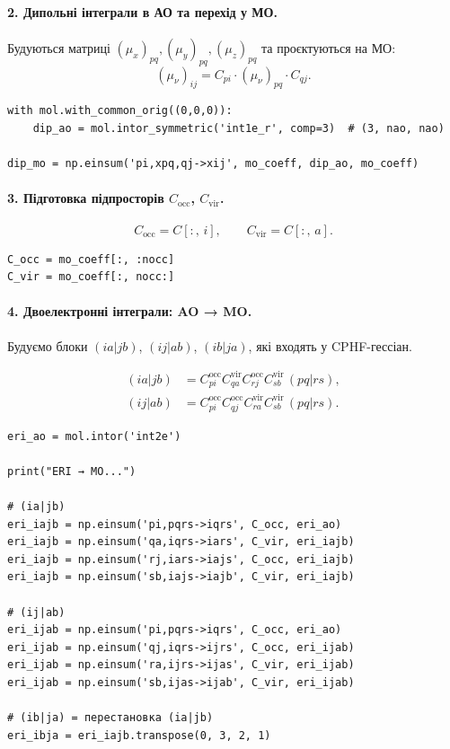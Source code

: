 \paragraph{2. Дипольні інтеграли в АО та перехід у МО.}

Будуються матриці
\( (\mu_x)_{pq}, (\mu_y)_{pq}, (\mu_z)_{pq}\)
та проєктуються на МО:
\[
	(\mu_{\nu})_{ij} = C_{pi}\cdot (\mu_\nu)_{pq}\cdot C_{qj}.
\]

\begin{verbatim}
with mol.with_common_orig((0,0,0)):
    dip_ao = mol.intor_symmetric('int1e_r', comp=3)  # (3, nao, nao)

dip_mo = np.einsum('pi,xpq,qj->xij', mo_coeff, dip_ao, mo_coeff)
\end{verbatim}

\paragraph{3. Підготовка підпросторів $C_{\text{occ}}$, $C_{\text{vir}}$.}

\[
	C_{\text{occ}} = C[:,\, i],\qquad
	C_{\text{vir}} = C[:,\, a].
\]

\begin{verbatim}
C_occ = mo_coeff[:, :nocc]
C_vir = mo_coeff[:, nocc:]
\end{verbatim}

\paragraph{4. Двоелектронні інтеграли: AO → MO.}

Будуємо блоки
\((ia|jb)\), \((ij|ab)\), \((ib|ja)\),
які входять у CPHF-гессіан.

\begin{align*}
	(ia|jb) & = C_{pi}^{\text{occ}} C_{qa}^{\text{vir}}
	C_{rj}^{\text{occ}} C_{sb}^{\text{vir}}\, (pq|rs),
	\\
	(ij|ab) & = C_{pi}^{\text{occ}} C_{qj}^{\text{occ}}
	C_{ra}^{\text{vir}} C_{sb}^{\text{vir}}\, (pq|rs).
\end{align*}

\begin{verbatim}
eri_ao = mol.intor('int2e')

print("ERI → MO...")

# (ia|jb)
eri_iajb = np.einsum('pi,pqrs->iqrs', C_occ, eri_ao)
eri_iajb = np.einsum('qa,iqrs->iars', C_vir, eri_iajb)
eri_iajb = np.einsum('rj,iars->iajs', C_occ, eri_iajb)
eri_iajb = np.einsum('sb,iajs->iajb', C_vir, eri_iajb)

# (ij|ab)
eri_ijab = np.einsum('pi,pqrs->iqrs', C_occ, eri_ao)
eri_ijab = np.einsum('qj,iqrs->ijrs', C_occ, eri_ijab)
eri_ijab = np.einsum('ra,ijrs->ijas', C_vir, eri_ijab)
eri_ijab = np.einsum('sb,ijas->ijab', C_vir, eri_ijab)

# (ib|ja) = перестановка (ia|jb)
eri_ibja = eri_iajb.transpose(0, 3, 2, 1)
\end{verbatim}

